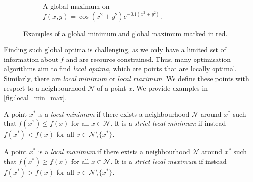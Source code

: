 \begin{figure}[h]
\begin{subfigure}[b]{0.48\linewidth}
        \caption{A global maximum on \\

        $f(x,y) = \cos(x^2 + y^2) e^{-0.1 (x^2 + y^2)}$.}

        \label{fig:global_max}

    \end{subfigure}

    \caption{Examples of a global minimum and global maximum marked in red.}

    \label{fig:global_min_max}

\end{figure}



Finding such global optima is challenging, as we only have a limited set of information about $f$ and are resource constrained. Thus, many optimisation algorithms aim to find \textit{local optima}, which are points that are locally optimal. Similarly, there are \textit{local minimum} or \textit{local maximum}. We define these points with respect to a neighbourhood $\mathcal{N}$ of a point $x$. We provide examples in \cref{fig:local_min_max}.



\begin{definition}

    A point $x^*$ is a \textit{local minimum} if there exists a neighbourhood $\mathcal{N}$ around $x^*$ such that $f(x^*) \leq f(x)$ for all $x \in \mathcal{N}$. It is a \textit{strict local minimum} if instead $f(x^*) < f(x)$ for all $x \in \mathcal{N} \setminus \{x^*\}$.

\end{definition}



\begin{definition}

    A point $x^*$ is a \textit{local maximum} if there exists a neighbourhood $\mathcal{N}$ around $x^*$ such that $f(x^*) \geq f(x)$ for all $x \in \mathcal{N}$. It is a \textit{strict local maximum} if instead $f(x^*) > f(x)$ for all $x \in \mathcal{N} \setminus \{x^*\}$.

\end{definition}



